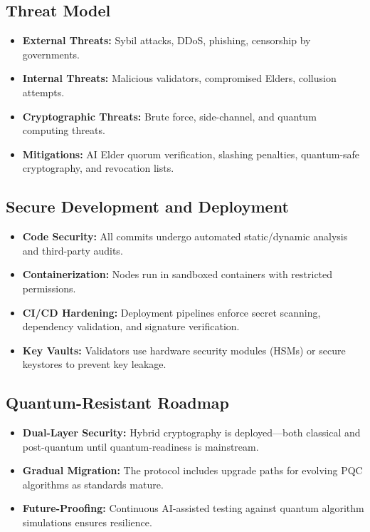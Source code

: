 \documentclass[11pt,a4paper]{article}
\begin{document}
\subsection{Threat Model}
\begin{itemize}
    \item \textbf{External Threats:} Sybil attacks, DDoS, phishing, censorship by governments.  
    \item \textbf{Internal Threats:} Malicious validators, compromised Elders, collusion attempts.  
    \item \textbf{Cryptographic Threats:} Brute force, side-channel, and quantum computing threats.  
    \item \textbf{Mitigations:} AI Elder quorum verification, slashing penalties, quantum-safe cryptography, and revocation lists.  
\end{itemize}

\subsection{Secure Development and Deployment}
\begin{itemize}
    \item \textbf{Code Security:} All commits undergo automated static/dynamic analysis and third-party audits.  
    \item \textbf{Containerization:} Nodes run in sandboxed containers with restricted permissions.  
    \item \textbf{CI/CD Hardening:} Deployment pipelines enforce secret scanning, dependency validation, and signature verification.  
    \item \textbf{Key Vaults:} Validators use hardware security modules (HSMs) or secure keystores to prevent key leakage.  
\end{itemize}

\subsection{Quantum-Resistant Roadmap}
\begin{itemize}
    \item \textbf{Dual-Layer Security:} Hybrid cryptography is deployed—both classical and post-quantum until quantum-readiness is mainstream.  
    \item \textbf{Gradual Migration:} The protocol includes upgrade paths for evolving PQC algorithms as standards mature.  
    \item \textbf{Future-Proofing:} Continuous AI-assisted testing against quantum algorithm simulations ensures resilience.  
\end{itemize}
\end{document}
